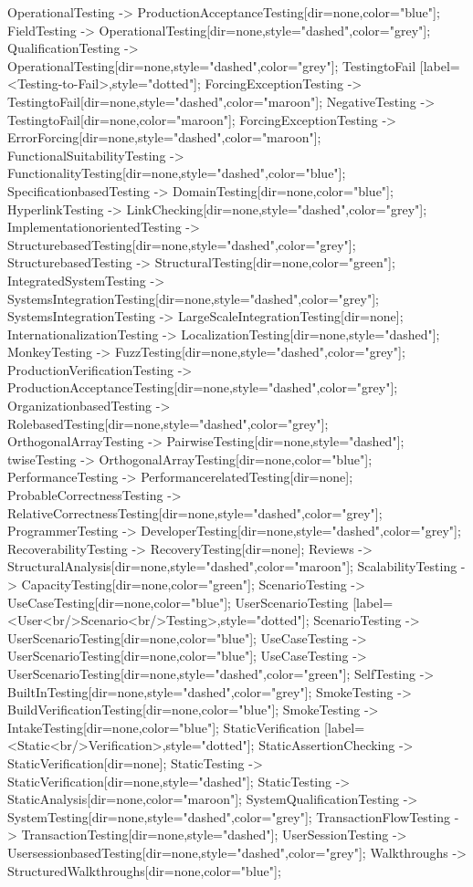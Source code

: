 \documentclass{article}
\begin{document}
{OperationalTesting -> ProductionAcceptanceTesting[dir=none,color="blue"];
FieldTesting -> OperationalTesting[dir=none,style="dashed",color="grey"];
QualificationTesting -> OperationalTesting[dir=none,style="dashed",color="grey"];
TestingtoFail [label=<Testing-to-Fail>,style="dotted"];
ForcingExceptionTesting -> TestingtoFail[dir=none,style="dashed",color="maroon"];
NegativeTesting -> TestingtoFail[dir=none,color="maroon"];
ForcingExceptionTesting -> ErrorForcing[dir=none,style="dashed",color="maroon"];
FunctionalSuitabilityTesting -> FunctionalityTesting[dir=none,style="dashed",color="blue"];
SpecificationbasedTesting -> DomainTesting[dir=none,color="blue"];
HyperlinkTesting -> LinkChecking[dir=none,style="dashed",color="grey"];
ImplementationorientedTesting -> StructurebasedTesting[dir=none,style="dashed",color="grey"];
StructurebasedTesting -> StructuralTesting[dir=none,color="green"];
IntegratedSystemTesting -> SystemsIntegrationTesting[dir=none,style="dashed",color="grey"];
SystemsIntegrationTesting -> LargeScaleIntegrationTesting[dir=none];
InternationalizationTesting -> LocalizationTesting[dir=none,style="dashed"];
MonkeyTesting -> FuzzTesting[dir=none,style="dashed",color="grey"];
ProductionVerificationTesting -> ProductionAcceptanceTesting[dir=none,style="dashed",color="grey"];
OrganizationbasedTesting -> RolebasedTesting[dir=none,style="dashed",color="grey"];
OrthogonalArrayTesting -> PairwiseTesting[dir=none,style="dashed"];
twiseTesting -> OrthogonalArrayTesting[dir=none,color="blue"];
PerformanceTesting -> PerformancerelatedTesting[dir=none];
ProbableCorrectnessTesting -> RelativeCorrectnessTesting[dir=none,style="dashed",color="grey"];
ProgrammerTesting -> DeveloperTesting[dir=none,style="dashed",color="grey"];
RecoverabilityTesting -> RecoveryTesting[dir=none];
Reviews -> StructuralAnalysis[dir=none,style="dashed",color="maroon"];
ScalabilityTesting -> CapacityTesting[dir=none,color="green"];
ScenarioTesting -> UseCaseTesting[dir=none,color="blue"];
UserScenarioTesting [label=<User<br/>Scenario<br/>Testing>,style="dotted"];
ScenarioTesting -> UserScenarioTesting[dir=none,color="blue"];
UseCaseTesting -> UserScenarioTesting[dir=none,color="blue"];
UseCaseTesting -> UserScenarioTesting[dir=none,style="dashed",color="green"];
SelfTesting -> BuiltInTesting[dir=none,style="dashed",color="grey"];
SmokeTesting -> BuildVerificationTesting[dir=none,color="blue"];
SmokeTesting -> IntakeTesting[dir=none,color="blue"];
StaticVerification [label=<Static<br/>Verification>,style="dotted"];
StaticAssertionChecking -> StaticVerification[dir=none];
StaticTesting -> StaticVerification[dir=none,style="dashed"];
StaticTesting -> StaticAnalysis[dir=none,color="maroon"];
SystemQualificationTesting -> SystemTesting[dir=none,style="dashed",color="grey"];
TransactionFlowTesting -> TransactionTesting[dir=none,style="dashed"];
UserSessionTesting -> UsersessionbasedTesting[dir=none,style="dashed",color="grey"];
Walkthroughs -> StructuredWalkthroughs[dir=none,color="blue"];

}
\end{document}
